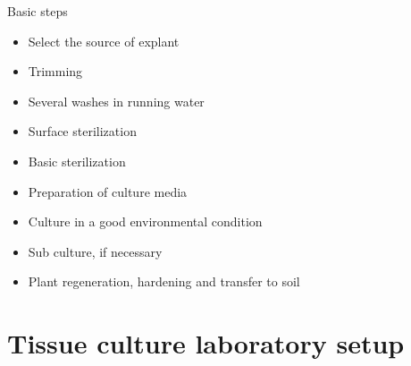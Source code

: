 \documentclass[
  ignorenonframetext,
  aspectratio=169]{beamer}
\providecommand{\tightlist}{%
  \setlength{\itemsep}{0pt}\setlength{\parskip}{0pt}}
\begin{document}
\begin{frame}{Basic steps}
\protect\hypertarget{basic-steps}{}
\begin{itemize}
\tightlist
\item
  Select the source of explant
\item
  Trimming
\item
  Several washes in running water
\item
  Surface sterilization
\item
  Basic sterilization
\item
  Preparation of culture media
\item
  Culture in a good environmental condition
\item
  Sub culture, if necessary
\item
  Plant regeneration, hardening and transfer to soil
\end{itemize}
\end{frame}

\hypertarget{tissue-culture-laboratory-setup}{%
\section{Tissue culture laboratory
setup}\label{tissue-culture-laboratory-setup}}
\end{document}
